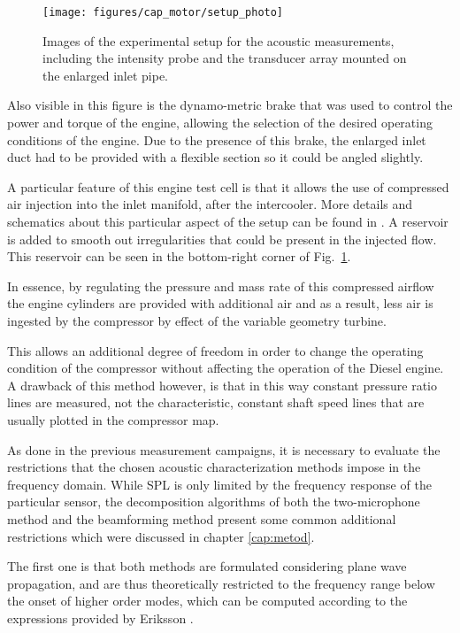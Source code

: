 \begin{figure}[hbt!]
\centering
\texttt{[image: figures/cap\_motor/setup\_photo]}
\caption{Images of the experimental setup for the acoustic measurements, including the intensity probe and the transducer array mounted on the enlarged inlet pipe.}
\label{fig:setup_photo}
\end{figure}

Also visible in this figure is the dynamo-metric brake that was used to control the power and torque of the engine, allowing the selection of the desired operating conditions of the engine. Due to the presence of this brake, the enlarged inlet duct had to be provided with a flexible section so it could be angled slightly.

A particular feature of this engine test cell is that it allows the use of compressed air injection into the inlet manifold, after the intercooler. More details and schematics about this particular aspect of the setup can be found in \cite{galindo2013engine,galindo2011measurement}. A reservoir is added to smooth out irregularities that could be present in the injected flow. This reservoir can be seen in the bottom-right corner of Fig.~\ref{fig:setup_photo}.

In essence, by regulating the pressure and mass rate of this compressed airflow the engine cylinders are provided with additional air and as a result, less air is ingested by the compressor by effect of the variable geometry turbine.

This allows an additional degree of freedom in order to change the operating condition of the compressor without affecting the operation of the Diesel engine. A drawback of this method however, is that in this way constant pressure ratio lines are measured, not the characteristic, constant shaft speed lines that are usually plotted in the compressor map.

As done in the previous measurement campaigns, it is necessary to evaluate the restrictions that the chosen acoustic characterization methods impose in the frequency domain. While SPL is only limited by the frequency response of the particular sensor, the decomposition algorithms of both the two-microphone method and the beamforming method present some common additional restrictions which were discussed in chapter \ref{cap:metod}.

The first one is that both methods are formulated considering plane wave propagation, and are thus theoretically restricted to the frequency range below the onset of higher order modes, which can be computed according to the expressions provided by Eriksson \cite{eriksson1980higher}.

